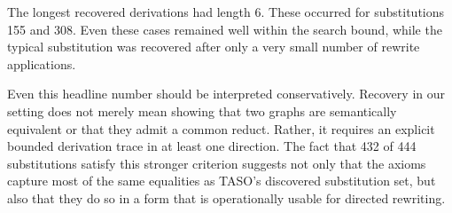 \documentclass[sigplan,10pt,nonacm]{acmart}
\begin{document}
The longest recovered derivations had length 6. These occurred for substitutions 155 and 308. Even these cases remained well within the search bound, while the typical substitution was recovered after only a very small number of rewrite applications.

Even this headline number should be interpreted conservatively. Recovery in our setting does not merely mean showing that two graphs are semantically equivalent or that they admit a common reduct. Rather, it requires an explicit bounded derivation trace in at least one direction. The fact that 432 of 444 substitutions satisfy this stronger criterion suggests not only that the axioms capture most of the same equalities as TASO's discovered substitution set, but also that they do so in a form that is operationally usable for directed rewriting.






\end{document}
